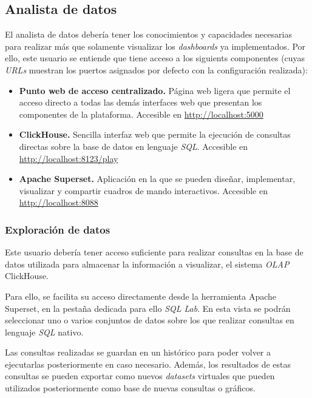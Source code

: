 \subsection{Analista de datos}

El analista de datos debería tener los conocimientos y capacidades necesarias para realizar más que solamente visualizar los \textit{dashboards} ya implementados. Por ello, este usuario se entiende que tiene acceso a los siguients componentes (cuyas \textit{URLs} muestran los puertos asignados por defecto con la configuración realizada):

\begin{itemize}
    \item \textbf{Punto web de acceso centralizado.} Página web ligera que permite el acceso directo a todas las demás interfaces web que presentan los componentes de la plataforma. Accesible en \url{http://localhost:5000}

    \item \textbf{ClickHouse.} Sencilla interfaz web que permite la ejecución de consultas directas sobre la base de datos en lenguaje \textit{SQL}. Accesible en \url{http://localhost:8123/play}

    \item \textbf{Apache Superset.} Aplicación en la que se pueden diseñar, implementar, visualizar y compartir cuadros de mando interactivos. Accesible en \url{http://localhost:8088}
\end{itemize}

\subsubsection{Exploración de datos}

Este usuario debería tener acceso suficiente para realizar consultas en la base de datos utilizada para almacenar la información a visualizar, el sistema \textit{OLAP} ClickHouse.

Para ello, se facilita su acceso directamente desde la herramienta Apache Superset, en la pestaña dedicada para ello \textit{SQL Lab}. En esta vista se podrán seleccionar uno o varios conjuntos de datos sobre los que realizar consultas en lenguaje \textit{SQL} nativo.

Las consultas realizadas se guardan en un histórico para poder volver a ejecutarlas posteriormente en caso necesario. Además, los resultados de estas consultas se pueden exportar como nuevos \textit{datasets} virtuales que pueden utilizados posteriormente como base de nuevas consultas o gráficos.


